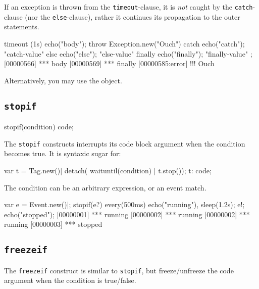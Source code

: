 If an exception is thrown from the \lstinline{timeout}-clause, it is
\emph{not} caught by the \lstinline{catch}-clause (nor the
\lstinline{else}-clause), rather it continues its propagation to the outer
statements.

\begin{urbiscript}
timeout (1s)  { echo("body"); throw Exception.new("Ouch") }
catch         { echo("catch"); "catch-value" }
else          { echo("else"); "else-value" }
finally       { echo("finally"); "finally-value" };
[00000566] *** body
[00000569] *** finally
[00000585:error] !!! Ouch
\end{urbiscript}

Alternatively, you may use the  object.

\subsection{\lstinline{stopif}}
\label{sec:lang:stopif}

\begin{urbiunchecked}
stopif(condition) { code};
\end{urbiunchecked}

The \lstinline{stopif} constructs interrupts its code block argument when the
condition becomes true. It is syntaxic sugar for:

\begin{urbiunchecked}
var t = Tag.new()|
detach({ waituntil(condition) | t.stop()});
t: { code};
\end{urbiunchecked}

The condition can be an arbitrary expression, or an event match.

\begin{urbiscript}

var e = Event.new()|;
stopif(e?) every(500ms) echo("running"),
sleep(1.2s); e!; echo("stopped");
[00000001] *** running
[00000002] *** running
[00000002] *** running
[00000003] *** stopped

\end{urbiscript}

\subsection{\lstinline{freezeif}}
\label{sec:lang:freezeif}

The \lstinline{freezeif} construct is similar to \lstinline{stopif}, but
freeze/unfreeze the code argument when the condition is true/false.


